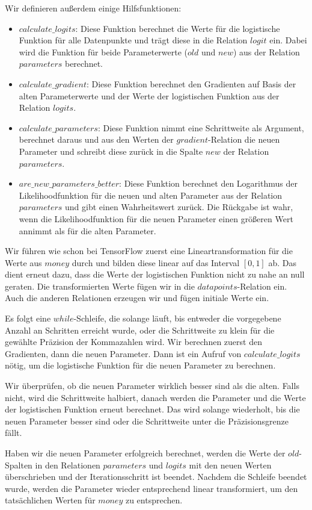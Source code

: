 Wir definieren außerdem einige Hilfsfunktionen:
\begin{itemize}
  \item $calculate\_logits$: Diese Funktion berechnet die Werte für die logistische Funktion für alle Datenpunkte und trägt diese in die Relation $logit$ ein. Dabei wird die Funktion für beide Parameterwerte ($old$ und $new$) aus der Relation $parameters$ berechnet.
  \item $calculate\_gradient$: Diese Funktion berechnet den Gradienten auf Basis der alten Parameterwerte und der Werte der logistischen Funktion aus der Relation $logits$.
  \item $calculate\_parameters$: Diese Funktion nimmt eine Schrittweite als Argument, berechnet daraus und aus den Werten der $gradient$-Relation die neuen Parameter und schreibt diese zurück in die Spalte $new$ der Relation $parameters$.
  \item $are\_new\_parameters\_better$: Diese Funktion berechnet den Logarithmus der Likelihoodfunktion für die neuen und alten Parameter aus der Relation $parameters$ und gibt einen Wahrheitswert zurück. Die Rückgabe ist wahr, wenn die Likelihoodfunktion für die neuen Parameter einen größeren Wert annimmt als für die alten Parameter.
\end{itemize}

Wir führen wie schon bei TensorFlow zuerst eine Lineartransformation für die Werte aus $money$ durch und bilden diese linear auf das Interval $[0, 1]$ ab. Das dient erneut dazu, dass die Werte der logistischen Funktion nicht zu nahe an null geraten. Die transformierten Werte fügen wir in die $datapoints$-Relation ein. Auch die anderen Relationen erzeugen wir und fügen initiale Werte ein.

Es folgt eine $while$-Schleife, die solange läuft, bis entweder die vorgegebene Anzahl an Schritten erreicht wurde, oder die Schrittweite zu klein für die gewählte Präzision der Kommazahlen wird. Wir berechnen zuerst den Gradienten, dann die neuen Parameter. Dann ist ein Aufruf von $calculate\_logits$ nötig, um die logistische Funktion für die neuen Parameter zu berechnen.

Wir überprüfen, ob die neuen Parameter wirklich besser sind als die alten. Falls nicht, wird die Schrittweite halbiert, danach werden die Parameter und die Werte der logistischen Funktion erneut berechnet. Das wird solange wiederholt, bis die neuen Parameter besser sind oder die Schrittweite unter die Präzisionsgrenze fällt.

Haben wir die neuen Parameter erfolgreich berechnet, werden die Werte der $old$-Spalten in den Relationen $parameters$ und $logits$ mit den neuen Werten überschrieben und der Iterationsschritt ist beendet. Nachdem die Schleife beendet wurde, werden die Parameter wieder entsprechend linear transformiert, um den tatsächlichen Werten für $money$ zu entsprechen.

